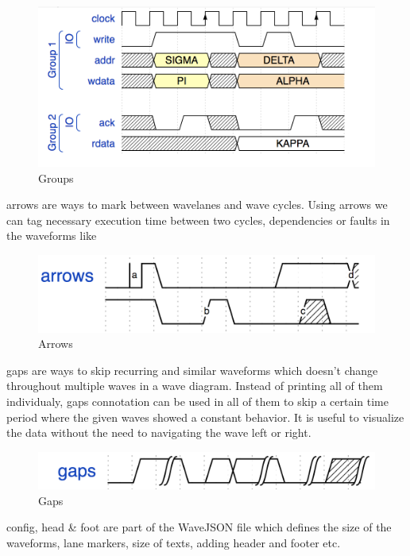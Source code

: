 \documentclass[14pt]{extarticle}
\begin{document}
\begin{figure}[H]
    \centering
    \includegraphics[scale=0.7]{groups}
    \caption{Groups}
    \label{fig:my_label}
\end{figure}

arrows are ways to mark between wavelanes and wave cycles. Using arrows we can tag necessary execution time between two cycles, dependencies or faults in the waveforms like 

\begin{figure}[H]
    \centering
    \includegraphics[scale=0.7]{arrow}
    \caption{Arrows}
    \label{fig:my_label}
\end{figure}

gaps are ways to skip recurring and similar waveforms which doesn't change throughout multiple waves in a wave diagram. Instead of printing all of them individualy, gaps connotation can be used in all of them to skip a certain time period where the given waves showed a constant behavior. It is useful to visualize the data without the need to navigating the wave left or right.

\begin{figure}[H]
    \centering
    \includegraphics[scale=0.7]{gaps}
    \caption{Gaps}
    \label{fig:my_label}
\end{figure}

config, head & foot are part of the WaveJSON file which defines the size of the waveforms, lane markers, size of texts, adding header and footer etc.
\end{document}

